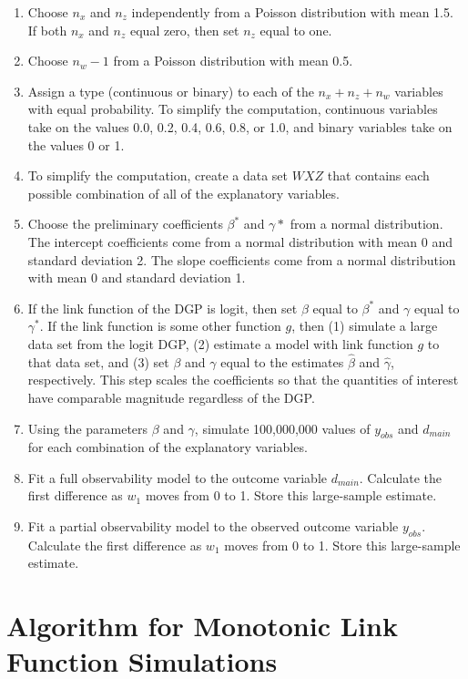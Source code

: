 \documentclass[10pt]{article}
\begin{document}
\begin{enumerate}
\item Choose $n_x$ and $n_z$ independently from a Poisson distribution with mean 1.5. If both $n_x$ and $n_z$ equal zero, then set $n_z$ equal to one.
\item Choose $n_w - 1$ from a Poisson distribution with mean 0.5.
\item Assign a type (continuous or binary) to each of the $n_x + n_z + n_w$ variables with equal probability. To simplify the computation, continuous variables take on the values 0.0, 0.2, 0.4, 0.6, 0.8, or 1.0, and binary variables take on the values 0 or 1.
\item To simplify the computation, create a data set $WXZ$ that contains each possible combination of all of the explanatory variables.
\item Choose the preliminary coefficients $\beta^*$ and $\gamma*$ from a normal distribution. The intercept coefficients come from a normal distribution with mean 0 and standard deviation 2. The slope coefficients come from a normal distribution with mean 0 and standard deviation 1.
\item If the link function of the DGP is logit, then set $\beta$ equal to $\beta^*$ and $\gamma$ equal to $\gamma^*$. If the link function is some other function $g$, then (1) simulate a large data set from the logit DGP, (2) estimate a model with link function $g$ to that data set, and (3) set $\beta$ and $\gamma$ equal to the estimates $\hat{\beta}$ and $\hat{\gamma}$, respectively. This step scales the coefficients so that the quantities of interest have comparable magnitude regardless of the DGP.
\item Using the parameters $\beta$ and $\gamma$, simulate 100,000,000 values of $y_{obs}$ and $d_{main}$ for each combination of the explanatory variables.
\item Fit a full observability model to the outcome variable $d_{main}$. Calculate the first difference as $w_1$ moves from 0 to 1. Store this large-sample estimate.
\item Fit a partial observability model to the observed outcome variable $y_{obs}$. Calculate the first difference as $w_1$ moves from 0 to 1. Store this large-sample estimate.
\end{enumerate}

\section{Algorithm for Monotonic Link Function Simulations}\label{app:mon}
\end{document}
